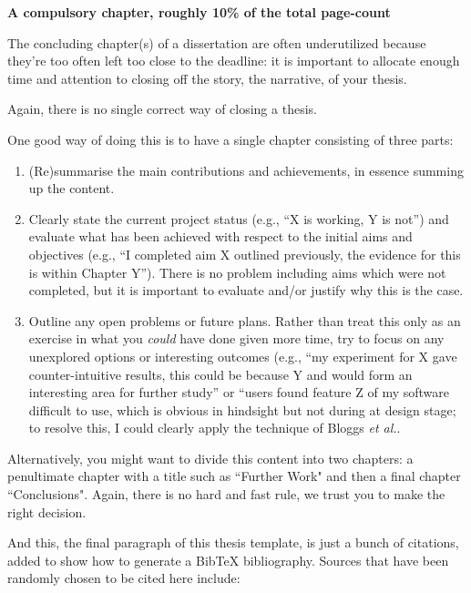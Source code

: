 \documentclass[ %
                    author={Carlos Duran Calle},
                supervisor={Dr. Felipe Campelo},
                    degree={MSc},
                     title={Comparative Machine Learning Analysis for Student Dropout Prediction in a Virtual Learning Environment},
                  subtitle={Incorporating Student Engagement and Socio-Economic Features},
                      type={},
                      year={2025}]{dissertation}
\begin{document}
{\bf A compulsory chapter,  roughly 10\% of the total page-count}
\vspace{1cm} 

\noindent
The concluding chapter(s) of a dissertation are often underutilized because they're 
too often left too close to the deadline: it is important to allocate enough time and 
attention to closing off the story, the narrative, of your thesis.

Again, there is no single correct way of closing a thesis. 

One good way of doing this is to have a single chapter consisting of three parts:

\begin{enumerate}
\item (Re)summarise the main contributions and achievements, in essence
      summing up the content.
\item Clearly state the current project status (e.g., ``X is working, Y 
      is not'') and evaluate what has been achieved with respect to the 
      initial aims and objectives (e.g., ``I completed aim X outlined 
      previously, the evidence for this is within Chapter Y'').  There 
      is no problem including aims which were not completed, but it is 
      important to evaluate and/or justify why this is the case.
\item Outline any open problems or future plans.  Rather than treat this
      only as an exercise in what you {\em could} have done given more 
      time, try to focus on any unexplored options or interesting outcomes
      (e.g., ``my experiment for X gave counter-intuitive results, this 
      could be because Y and would form an interesting area for further 
      study'' or ``users found feature Z of my software difficult to use,
      which is obvious in hindsight but not during at design stage; to 
      resolve this, I could clearly apply the technique of Bloggs {\em et al.}.
\end{enumerate}

Alternatively, you might want to divide this content into two chapters: a penultimate chapter with a title such as ``Further Work" and then a final chapter ``Conclusions". Again, there is no hard and fast rule, we trust you to make the right decision. 

And this, the final paragraph of this thesis template, is just a bunch of citations, added to show how to generate a BibTeX bibliography. Sources that have been randomly chosen to be cited here include:
\end{document}
